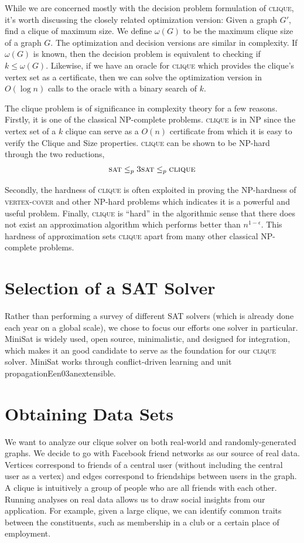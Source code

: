\documentclass[]{article}
\newcommand{\clique}{\textsc{clique}}
\begin{document}
	While we are concerned mostly with the decision problem formulation of \clique{}, it's worth discussing the closely related optimization version: Given a graph $G'$, find a clique of maximum size. We define $\omega(G)$ to be the maximum clique size of a graph $G$. The optimization and decision versions are similar in complexity. If $\omega(G)$ is known, then the decision problem is equivalent to checking if $k \le \omega(G)$. Likewise, if we have an oracle for \clique{} which provides the clique's vertex set as a certificate, then we can solve the optimization version in $O(\log n)$ calls to the oracle with a binary search of $k$.
	
	The clique problem is of significance in complexity theory for a few reasons. Firstly, it is one of the classical NP-complete problems. \clique{} is in NP since the vertex set of a $k$ clique can serve as a $O(n)$ certificate from which it is easy to verify the Clique and Size properties. \clique{} can be shown to be NP-hard through the two reductions,
	\begin{align}
	\textsc{sat} \le_p \textsc{3sat} \le_p \clique
	\end{align}
	
	Secondly, the hardness of \clique{} is often exploited in proving the NP-hardness of \textsc{vertex-cover} and other NP-hard problems which indicates it is a powerful and useful problem. Finally, \clique{} is ``hard'' in the algorithmic sense that there does not exist an approximation algorithm which performs better than $n^{1 - \epsilon}$\cite{Hastad1999}. This hardness of approximation sets \clique{} apart from many other classical NP-complete problems.
	
	\section{Selection of a SAT Solver}
	Rather than performing a survey of different SAT solvers (which is already done each year on a global scale), we chose to focus our efforts one solver in particular. MiniSat is widely used, open source, minimalistic, and designed for integration, which makes it an good candidate to serve as the foundation for our \clique{} solver. MiniSat works through conflict-driven learning and unit propagation{Een03anextensible}.
	
	\section{Obtaining Data Sets}
	We want to analyze our clique solver on both real-world and randomly-generated graphs. We decide to go with Facebook friend networks as our source of real data. Vertices correspond to friends of a central user (without including the central user as a vertex) and edges correspond to friendships between users in the graph. A clique is intuitively a group of people who are all friends with each other. Running analyses on real data allows us to draw social insights from our application. For example, given a large clique, we can identify common traits between the constituents, such as membership in a club or a certain place of employment.
	
\end{document}
